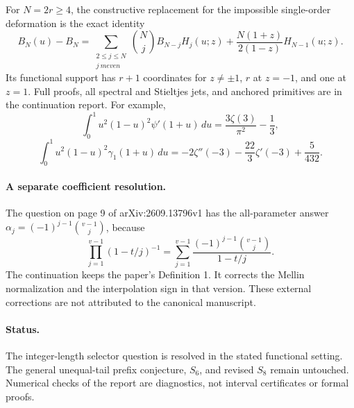 For $N=2r\ge4$, the constructive replacement for the impossible
single-order deformation is the exact identity
\[
 B_N(u)-B_N
 =\sum_{\substack{2\le j\le N\\ j\ {
m even}}}
       \binom Nj B_{N-j}H_j(u;z)
       +\frac{N(1+z)}{2(1-z)}H_{N-1}(u;z).
\]
Its functional support has $r+1$ coordinates for $z\ne\pm1$, $r$ at
$z=-1$, and one at $z=1$. Full proofs, all spectral and Stieltjes
jets, and anchored primitives are in the continuation report.
For example,
\[
 \int_0^1 u^2(1-u)^2\psi'(1+u)\,du
           =\frac{3\zeta(3)}{\pi^2}-\frac13,
\]
\[
 \int_0^1 u^2(1-u)^2\gamma_1(1+u)\,du
 =-2\zeta''(-3)-\frac{22}{3}\zeta'(-3)+\frac5{432}.
\]

\paragraph{A separate coefficient resolution.}
The question on page 9 of arXiv:2609.13796v1 has the all-parameter
answer $\alpha_j=(-1)^{j-1}\binom{v-1}{j}$, because
\[
 \prod_{j=1}^{v-1}(1-t/j)^{-1}
 =\sum_{j=1}^{v-1}\frac{(-1)^{j-1}\binom{v-1}{j}}{1-t/j}.
\]
The continuation keeps the paper's Definition 1. It corrects the
Mellin normalization and the interpolation sign in that version.
These external corrections are not attributed to the canonical
manuscript.

\paragraph{Status.}
The integer-length selector question is resolved in the stated
functional setting. The general unequal-tail prefix conjecture,
$S_6$, and revised $S_8$ remain untouched. Numerical checks of the
report are diagnostics, not interval certificates or formal proofs.
